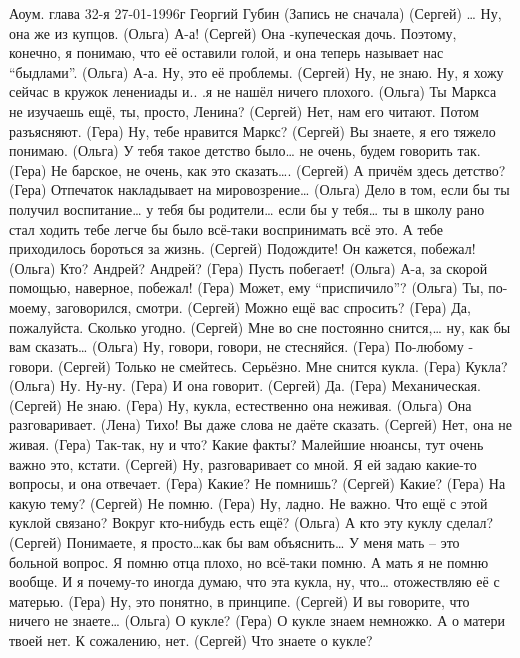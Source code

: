 Аоум. глава 32-я 27-01-1996г
Георгий Губин
\people{**}
 (Запись не сначала)
 (Сергей) … Ну, она же из купцов.
 (Ольга)   А-а!
 (Сергей) Она -купеческая дочь.  Поэтому, конечно,  я понимаю, что её оставили голой, и она теперь называет нас ``быдлами''.
 (Ольга)   А-а. Ну, это её проблемы.
 (Сергей) Ну, не знаю. Ну, я хожу сейчас в кружок ленениады и.. .я не нашёл ничего плохого.
 (Ольга)   Ты Маркса не изучаешь ещё, ты, просто, Ленина?
 (Сергей) Нет, нам его читают. Потом разъясняют. 
 (Гера)   Ну, тебе нравится Маркс?
 (Сергей) Вы знаете, я его тяжело понимаю.
 (Ольга)  У тебя такое  детство было… не очень, будем говорить так. 
 (Гера)    Не барское, не очень, как это сказать….
 (Сергей) А причём здесь детство?
 (Гера)   Отпечаток накладывает на мировозрение…
 (Ольга)  Дело в том, если бы ты получил воспитание… у тебя бы родители… если бы у тебя… ты в школу рано стал ходить тебе легче бы было всё-таки воспринимать всё это. А тебе приходилось бороться за жизнь.
 (Сергей) Подождите! Он кажется, побежал!
 (Ольга)  Кто? Андрей? Андрей?
 (Гера)   Пусть побегает!
 (Ольга)  А-а, за скорой помощью, наверное, побежал!
 (Гера)   Может, ему ``приспичило''?
 (Ольга)  Ты, по-моему, заговорился, смотри.
 (Сергей) Можно ещё вас спросить?
 (Гера)   Да, пожалуйста. Сколько угодно. 
 (Сергей) Мне во сне постоянно снится,… ну, как бы вам сказать…
 (Ольга)  Ну, говори, говори,  не стесняйся.
 (Гера)   По-любому - говори.
 (Сергей) Только не смейтесь. Серьёзно. Мне снится кукла.
 (Гера)   Кукла?
 (Ольга)  Ну. Ну-ну.
 (Гера)   И она говорит.
 (Сергей) Да.
 (Гера)   Механическая.
 (Сергей) Не знаю.
 (Гера)   Ну, кукла, естественно она неживая.
 (Ольга)  Она разговаривает.
 (Лена)   Тихо! Вы даже слова не даёте сказать.
 (Сергей) Нет, она не живая.
 (Гера)   Так-так, ну и что? Какие факты? Малейшие нюансы, тут очень важно это, кстати.
 (Сергей) Ну, разговаривает со мной. Я ей задаю какие-то вопросы, и она отвечает.
 (Гера)   Какие? Не помнишь?
 (Сергей) Какие?
 (Гера)   На какую тему?
 (Сергей) Не помню.
 (Гера)   Ну, ладно. Не важно. Что ещё с этой куклой связано? Вокруг кто-нибудь есть ещё?
 (Ольга)  А кто эту куклу сделал?
 (Сергей) Понимаете, я просто…как бы вам объяснить… У меня мать – это больной вопрос. Я помню отца плохо, но всё-таки помню. А мать я не помню вообще. И я почему-то иногда думаю, что эта кукла, ну, что…  отожествляю её с матерью. 
 (Гера)   Ну, это понятно, в принципе.
 (Сергей) И вы говорите, что  ничего не знаете…
 (Ольга)  О кукле?
 (Гера)   О кукле знаем немножко. А о матери твоей нет. К сожалению, нет.
 (Сергей) Что знаете о кукле?
  
